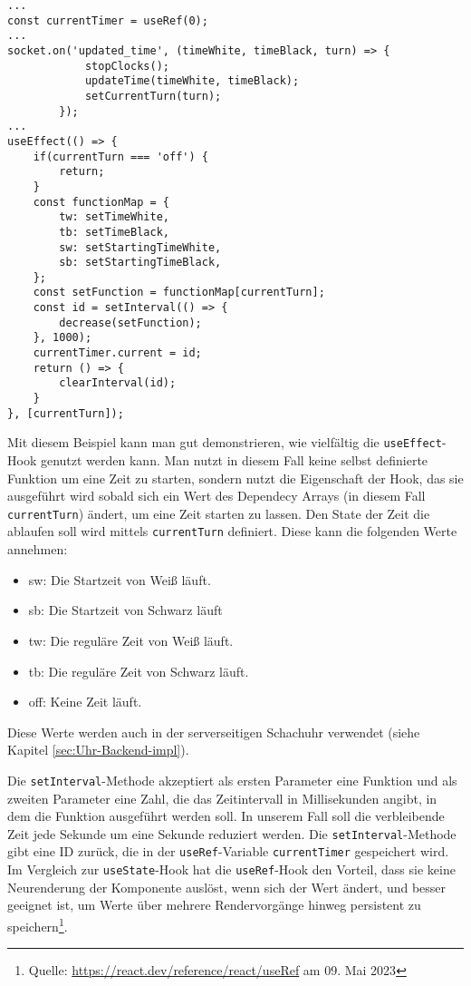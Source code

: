 \begin{lstlisting}[style=codeStyle, caption={Ausschnitt der \textit{ChessClock}-Komponente}, label={lst:ChessClock}]
...
const currentTimer = useRef(0);
...
socket.on('updated_time', (timeWhite, timeBlack, turn) => {
            stopClocks();
            updateTime(timeWhite, timeBlack);
            setCurrentTurn(turn);
        });
...
useEffect(() => {
    if(currentTurn === 'off') {
        return;
    }
    const functionMap = {
        tw: setTimeWhite,
        tb: setTimeBlack,
        sw: setStartingTimeWhite,
        sb: setStartingTimeBlack,
    };
    const setFunction = functionMap[currentTurn];
    const id = setInterval(() => {
        decrease(setFunction);
    }, 1000);
    currentTimer.current = id;
    return () => {
        clearInterval(id);
    }
}, [currentTurn]);
\end{lstlisting}

Mit diesem Beispiel kann man gut demonstrieren, wie vielfältig die \verb|useEffect|-Hook genutzt werden kann. Man nutzt in diesem Fall keine selbst definierte Funktion um eine Zeit zu starten, sondern nutzt die Eigenschaft der Hook, das sie ausgeführt wird sobald sich ein Wert des Dependecy Arrays (in diesem Fall \verb|currentTurn|) ändert, um eine Zeit starten zu lassen. Den State der Zeit die ablaufen soll wird mittels \verb|currentTurn| definiert. Diese kann die folgenden Werte annehmen:

\begin{itemize}
\item \glqq sw\grqq : Die Startzeit von Weiß läuft.
\item \glqq sb\grqq : Die Startzeit von Schwarz läuft
\item \glqq tw\grqq : Die reguläre Zeit von Weiß läuft.
\item \glqq tb\grqq : Die reguläre Zeit von Schwarz läuft.
\item \glqq off\grqq : Keine Zeit läuft.
\end{itemize}

Diese Werte werden auch in der serverseitigen Schachuhr verwendet (siehe Kapitel \ref{sec:Uhr-Backend-impl}).

Die \verb|setInterval|-Methode akzeptiert als ersten Parameter eine Funktion und als zweiten Parameter eine Zahl, die das Zeitintervall in Millisekunden angibt, in dem die Funktion ausgeführt werden soll. In unserem Fall soll die verbleibende Zeit jede Sekunde um eine Sekunde reduziert werden. Die \verb|setInterval|-Methode gibt eine ID zurück, die in der \verb|useRef|-Variable \verb|currentTimer| gespeichert wird. Im Vergleich zur \verb|useState|-Hook hat die \verb|useRef|-Hook den Vorteil, dass sie keine Neurenderung der Komponente auslöst, wenn sich der Wert ändert, und besser geeignet ist, um Werte über mehrere Rendervorgänge hinweg persistent zu speichern\footnote{Quelle: \url{https://react.dev/reference/react/useRef} am 09. Mai 2023}.

